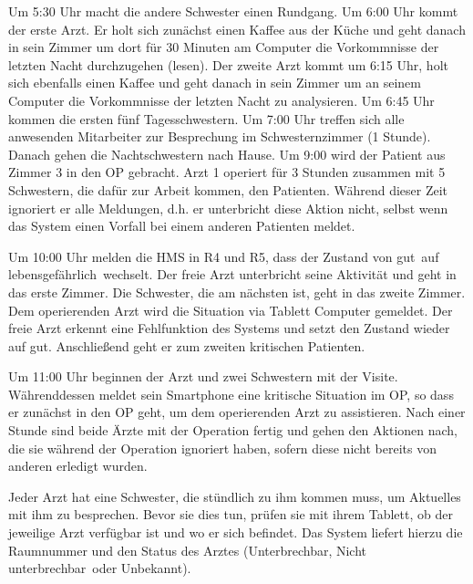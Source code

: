 Um 5:30 Uhr macht die andere Schwester einen Rundgang. Um 6:00 Uhr kommt der erste Arzt. Er holt sich zunächst einen Kaffee aus der Küche und geht danach in sein Zimmer  um dort für 30 Minuten am Computer die Vorkommnisse der letzten Nacht durchzugehen (lesen). Der zweite Arzt kommt um 6:15 Uhr, holt sich ebenfalls einen Kaffee und geht danach in sein Zimmer um an seinem Computer die Vorkommnisse der letzten Nacht zu analysieren. Um 6:45 Uhr kommen die ersten fünf Tagesschwestern. Um 7:00 Uhr treffen sich alle anwesenden Mitarbeiter zur Besprechung im Schwesternzimmer (1 Stunde). Danach gehen die Nachtschwestern nach Hause. Um 9:00 wird der Patient aus Zimmer 3 in den OP gebracht. Arzt 1 operiert für 3 Stunden zusammen mit 5 Schwestern, die dafür zur Arbeit kommen, den Patienten. Während dieser Zeit ignoriert er alle Meldungen, d.h. er unterbricht diese Aktion nicht, selbst wenn das System einen Vorfall bei einem anderen Patienten meldet.

Um 10:00 Uhr melden die HMS in R4 und R5, dass der Zustand von \glqq gut\grqq\ auf \glqq lebensgefährlich\grqq\ wechselt. Der freie Arzt unterbricht seine Aktivität und geht in das erste Zimmer. Die Schwester, die am nächsten ist, geht in das zweite Zimmer. Dem operierenden Arzt wird die Situation via Tablett Computer gemeldet. Der freie Arzt erkennt eine Fehlfunktion des Systems und setzt den Zustand wieder auf \glqq gut\grqq. Anschließend geht er zum zweiten kritischen Patienten. 

Um 11:00 Uhr beginnen der Arzt und zwei Schwestern mit der Visite. Währenddessen meldet sein Smartphone eine kritische Situation im OP, so dass er zunächst in den OP geht, um dem operierenden Arzt zu assistieren. Nach einer Stunde sind beide Ärzte mit der Operation fertig und gehen den Aktionen nach, die sie während der Operation ignoriert haben, sofern diese nicht bereits von anderen erledigt wurden.

Jeder Arzt hat eine Schwester, die stündlich zu ihm kommen muss, um Aktuelles mit ihm zu besprechen. Bevor sie dies tun, prüfen sie mit ihrem Tablett, ob der jeweilige Arzt verfügbar ist und wo er sich befindet. Das System liefert hierzu die Raumnummer und den Status des Arztes (\glqq Unterbrechbar\grqq, \glqq Nicht unterbrechbar\grqq\ oder \glqq Unbekannt\grqq).


